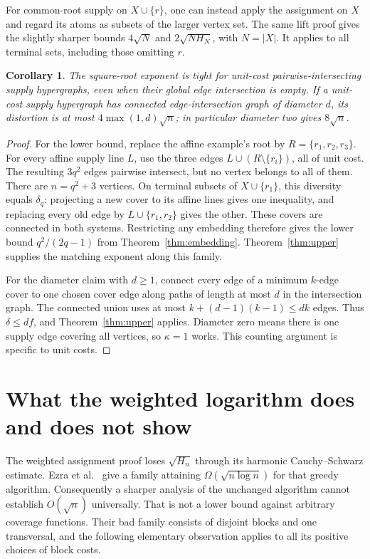 \documentclass[11pt]{article}
\newtheorem{corollary}[theorem]{Corollary}
\begin{document}
For common-root supply on $X\cup\{r\}$, one can instead apply the assignment
on $X$ and regard its atoms as subsets of the larger vertex set. The same
lift proof gives the slightly sharper bounds $4\sqrt N$ and
$2\sqrt{NH_N}$, with $N=|X|$. It applies to all terminal sets, including
those omitting $r$.

\begin{corollary}\label{cor:nonroot}
The square-root exponent is tight for unit-cost pairwise-intersecting
supply hypergraphs, even when their global edge intersection is empty.
If a unit-cost supply hypergraph has connected edge-intersection graph
of diameter $d$, its distortion is at most $4\max(1,d)\sqrt n$;
in particular diameter two gives $8\sqrt n$.
\end{corollary}
\begin{proof}
For the lower bound, replace the affine example's root by
$R=\{r_1,r_2,r_3\}$. For every affine supply line $L$, use the three edges
$L\cup(R\setminus\{r_i\})$, all of unit cost. The resulting $3q^2$ edges
pairwise intersect, but no vertex belongs to all of them. There are
$n=q^2+3$ vertices. On terminal subsets of $X\cup\{r_1\}$, this diversity
equals $\delta_q$: projecting a new cover to its affine lines gives one
inequality, and replacing every old edge by $L\cup\{r_1,r_2\}$ gives the
other. These covers are connected in both systems. Restricting any embedding
therefore gives the lower bound $q^2/(2q-1)$ from Theorem~\ref{thm:embedding}.
Theorem~\ref{thm:upper} supplies the matching exponent along this family.

For the diameter claim with $d\ge1$, connect every edge of a minimum
$k$-edge cover to one chosen cover edge along paths of length at most $d$
in the intersection graph. The connected union uses at most
$k+(d-1)(k-1)\le dk$ edges. Thus $\delta\le df$, and
Theorem~\ref{thm:upper} applies. Diameter zero means there is one supply
edge covering all vertices, so $\kappa=1$ works. This counting argument
is specific to unit costs.
\end{proof}

\section{What the weighted logarithm does and does not show}
The weighted assignment proof loses $\sqrt{H_n}$ through its harmonic
Cauchy--Schwarz estimate. Ezra et al.\ \cite[Appendix B, Proposition B.1]{JRP}
give a family attaining $\Omega(\sqrt{n\log n})$ for that greedy algorithm.
Consequently a sharper analysis of the unchanged algorithm cannot establish
$O(\sqrt n)$ universally. That is not a lower bound against arbitrary
coverage functions. Their bad family consists of disjoint blocks and one
transversal, and the following elementary observation applies to all its
positive choices of block costs.
\end{document}
